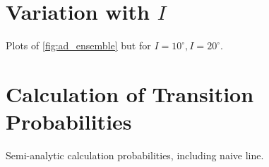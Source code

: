 \documentclass[
        fleqn,
        usenatbib,
    ]{mnras}
\begin{document}
\section{Variation with $I$}

Plots of \autoref{fig:ad_ensemble} but for $I = 10^\circ, I=20^\circ$.

\section{Calculation of Transition Probabilities}\label{ss:app_transition}

Semi-analytic calculation probabilities, including naive line.

\label{lastpage} %
\end{document}
